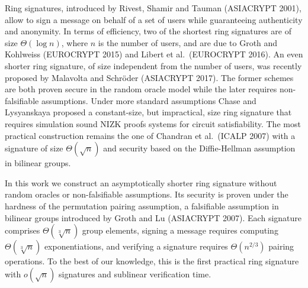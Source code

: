 
Ring signatures, introduced by Rivest, Shamir and Tauman (ASIACRYPT 2001), allow to sign a message on behalf of a set of users while guaranteeing authenticity and anonymity. In terms of efficiency, two of the shortest ring signatures are of size $\Theta(\log n)$, where $n$ is the number of users, and are due to Groth and Kohlweiss (EUROCRYPT 2015) and Libert et al.~(EUROCRYPT 2016). An even shorter ring signature, of size independent from the number of users, was recently proposed by Malavolta and  Schr\"oder (ASIACRYPT 2017).
The former schemes are both proven secure in the random oracle model while the later requires non-falsifiable assumptions.
Under more standard assumptions Chase and Lysyanskaya proposed a constant-size, but impractical, size ring signature that requires simulation sound NIZK proofs systems for circuit satisfiability.
The most practical construction remains the one of Chandran et al.~(ICALP 2007) with a signature of size $\Theta(\sqrt{n})$ and security based on the Diffie-Hellman assumption in bilinear groups.

In this work we construct an asymptotically shorter ring signature without random oracles or non-falsifiable assumptions. Its security is proven under the hardness of the permutation pairing assumption, a falsifiable assumption in bilinear groups introduced by Groth and Lu (ASIACRYPT 2007).
 Each signature comprises $\Theta(\sqrt[3]{n})$ group elements, signing a message requires computing $\Theta(\sqrt[3]{n})$ exponentiations, and verifying a signature requires $\Theta(n^{2/3})$ pairing operations. To the best of our knowledge, this is the first practical ring signature with $o(\sqrt{n})$ signatures and sublinear verification time.
